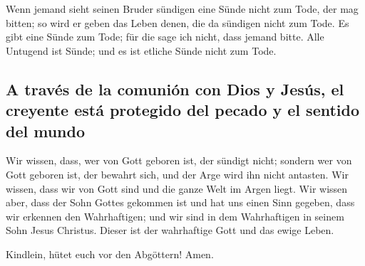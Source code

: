  Wenn jemand sieht seinen Bruder sündigen eine Sünde
nicht zum Tode, der mag bitten; so wird er geben das Leben denen, die da
sündigen nicht zum Tode. Es gibt eine Sünde zum Tode; für die sage ich
nicht, dass jemand bitte.  Alle Untugend ist Sünde; und
es ist etliche Sünde nicht zum Tode.

\hypertarget{a-travuxe9s-de-la-comuniuxf3n-con-dios-y-jesuxfas-el-creyente-estuxe1-protegido-del-pecado-y-el-sentido-del-mundo}{%
\subsection{A través de la comunión con Dios y Jesús, el creyente está
protegido del pecado y el sentido del
mundo}\label{a-travuxe9s-de-la-comuniuxf3n-con-dios-y-jesuxfas-el-creyente-estuxe1-protegido-del-pecado-y-el-sentido-del-mundo}}

 Wir wissen, dass, wer von Gott geboren ist, der sündigt
nicht; sondern wer von Gott geboren ist, der bewahrt sich, und der Arge
wird ihn nicht antasten.  Wir wissen, dass wir von Gott
sind und die ganze Welt im Argen liegt.  Wir wissen aber,
dass der Sohn Gottes gekommen ist und hat uns einen Sinn gegeben, dass
wir erkennen den Wahrhaftigen; und wir sind in dem Wahrhaftigen in
seinem Sohn Jesus Christus. Dieser ist der wahrhaftige Gott und das
ewige Leben.

 Kindlein, hütet euch vor den Abgöttern! Amen.
